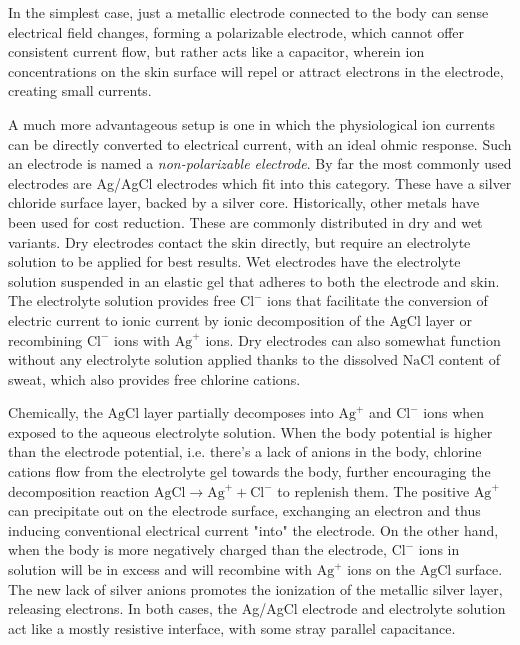 \documentclass{thesis}
\begin{document}
In the simplest case, just a metallic electrode connected to the body can sense electrical field changes, forming a polarizable electrode, which cannot offer consistent current flow, but rather acts like a capacitor, wherein ion concentrations on the skin surface will repel or attract electrons in the electrode, creating small currents.

A much more advantageous setup is one in which the physiological ion currents can be directly converted to electrical current, with an ideal ohmic response. Such an electrode is named a \textit{non-polarizable electrode}. By far the most commonly used electrodes are Ag/AgCl electrodes which fit into this category.\cite{Lee2008} These have a silver chloride surface layer, backed by a silver core. Historically, other metals have been used for cost reduction. These are commonly distributed in dry and wet variants. Dry electrodes contact the skin directly, but require an electrolyte solution to be applied for best results. Wet electrodes have the electrolyte solution suspended in an elastic gel that adheres to both the electrode and skin. The electrolyte solution provides free $\text{Cl}^-$ ions that facilitate the conversion of electric current to ionic current by ionic decomposition of the $\text{AgCl}$ layer or recombining $\text{Cl}^-$ ions with $\text{Ag}^+$ ions. Dry electrodes can also somewhat function without any electrolyte solution applied thanks to the dissolved $\text{NaCl}$ content of sweat, which also provides free chlorine cations.

Chemically, the $\text{AgCl}$ layer partially decomposes into $\text{Ag}^+$ and $\text{Cl}^-$ ions when exposed to the aqueous electrolyte solution. When the body potential is higher than the electrode potential, i.e. there's a lack of anions in the body, chlorine cations flow from the electrolyte gel towards the body, further encouraging the decomposition reaction $\text{AgCl} \rightarrow \text{Ag}^+ + \text{Cl}^-$ to replenish them. The positive $\text{Ag}^+$ can precipitate out on the electrode surface, exchanging an electron and thus inducing conventional electrical current "into" the electrode. On the other hand, when the body is more negatively charged than the electrode, $\text{Cl}^-$ ions in solution will be in excess and will recombine with $\text{Ag}^+$ ions on the $\text{AgCl}$ surface. The new lack of silver anions promotes the ionization of the metallic silver layer, releasing electrons. In both cases, the Ag/AgCl electrode and electrolyte solution act like a mostly resistive interface, with some stray parallel capacitance.
\end{document}
